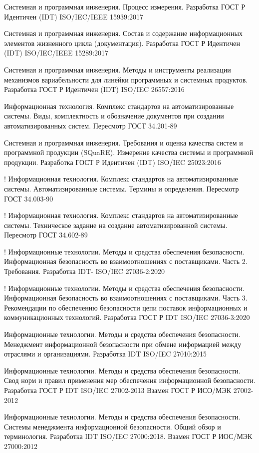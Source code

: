 Системная и программная инженерия. Процесс измерения. Разработка ГОСТ Р Идентичен (IDT) ISO/IEC/IEEE 15939:2017

Системная и программная инженерия. Состав и содержание информационных элементов жизненного цикла (документация). Разработка ГОСТ Р Идентичен (IDT) ISO/IEC/IEEE 15289:2017

Системная и программная инженерия. Методы и инструменты реализации механизмов вариабельности для линейки программных и системных продуктов. Разработка ГОСТ Р Идентичен (IDT) ISO/IEC 26557:2016

Информационная технология. Комплекс стандартов на автоматизированные системы. Виды, комплектность и обозначение документов при создании автоматизированных систем. Пересмотр ГОСТ 34.201-89

Системная и программная инженерия. Требования и оценка качества систем и программной продукции (SQuaRE). Измерение качества системы и программной продукции. Разработка ГОСТ Р Идентичен (IDT) ISO/IEC 25023:2016

! Информационная технология. Комплекс стандартов на автоматизированные системы. Автоматизированные системы. Термины и определения. Пересмотр ГОСТ 34.003-90

! Информационная технология. Комплекс стандартов на автоматизированные системы. Техническое задание на создание автоматизированной системы. Пересмотр ГОСТ 34.602-89

! Информационные технологии. Методы и средства обеспечения безопасности. Информационная безопасность во взаимоотношениях с поставщиками. Часть 2. Требования. Разработка IDT- ISO/IEC 27036-2:2020

! Информационные технологии. Методы и средства обеспечения безопасности. Информационная безопасность во взаимоотношениях с поставщиками. Часть 3. Рекомендации по обеспечению безопасности цепи поставок информационных и коммуникационных технологий. Разработка ГОСТ Р IDT ISO/IEC 27036-3:2020

Информационные технологии. Методы и средства обеспечения безопасности. Менеджмент информационной безопасности при обмене информацией между отраслями и организациями. Разработка IDT ISO/IEC 27010:2015

Информационные технологии. Методы и средства обеспечения безопасности. Свод норм и правил применения мер обеспечения информационной безопасности. Разработка ГОСТ Р IDT ISO/IEC 27002-2013 Взамен ГОСТ Р ИСО/МЭК 27002-2012

Информационные технологии. Методы и средства обеспечения безопасности. Системы менеджмента информационной безопасности. Общий обзор и терминология. Разработка IDT ISO/IEC 27000:2018. Взамен ГОСТ Р ИОС/МЭК 27000:2012

